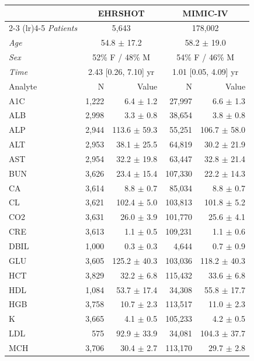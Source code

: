 \begin{table}[ht]
\centering
\scriptsize
\begin{tabular}{lrrrr}
\toprule
  & \multicolumn{2}{c}{EHRSHOT} & \multicolumn{2}{c}{MIMIC-IV} \\
\cmidrule(lr){2-3} \cmidrule(lr){4-5}
\textit{Patients} & \multicolumn{2}{c}{5,643} & \multicolumn{2}{c}{178,002} \\
\textit{Age} & \multicolumn{2}{c}{54.8 $\pm$ 17.2} & \multicolumn{2}{c}{58.2 $\pm$ 19.0} \\
\textit{Sex} & \multicolumn{2}{c}{52\% F / 48\% M} & \multicolumn{2}{c}{54\% F / 46\% M} \\
\textit{Time} & \multicolumn{2}{c}{2.43 [0.26, 7.10] yr} & \multicolumn{2}{c}{1.01 [0.05, 4.09] yr} \\
\midrule
Analyte & N & Value & N & Value \\
\midrule
A1C & 1,222 & 6.4 $\pm$ 1.2 & 27,997 & 6.6 $\pm$ 1.3 \\
ALB & 2,998 & 3.3 $\pm$ 0.8 & 38,654 & 3.8 $\pm$ 0.8 \\
ALP & 2,944 & 113.6 $\pm$ 59.3 & 55,251 & 106.7 $\pm$ 58.0 \\
ALT & 2,953 & 38.1 $\pm$ 25.5 & 64,819 & 30.2 $\pm$ 21.9 \\
AST & 2,954 & 32.2 $\pm$ 19.8 & 63,447 & 32.8 $\pm$ 21.4 \\
BUN & 3,626 & 23.4 $\pm$ 15.4 & 107,330 & 22.2 $\pm$ 14.3 \\
CA & 3,614 & 8.8 $\pm$ 0.7 & 85,034 & 8.8 $\pm$ 0.7 \\
CL & 3,621 & 102.4 $\pm$ 5.0 & 103,813 & 101.8 $\pm$ 5.2 \\
CO2 & 3,631 & 26.0 $\pm$ 3.9 & 101,770 & 25.6 $\pm$ 4.1 \\
CRE & 3,613 & 1.1 $\pm$ 0.5 & 109,231 & 1.1 $\pm$ 0.6 \\
DBIL & 1,000 & 0.3 $\pm$ 0.3 & 4,644 & 0.7 $\pm$ 0.9 \\
GLU & 3,605 & 125.2 $\pm$ 40.3 & 103,036 & 118.2 $\pm$ 40.3 \\
HCT & 3,829 & 32.2 $\pm$ 6.8 & 115,432 & 33.6 $\pm$ 6.8 \\
HDL & 1,084 & 53.7 $\pm$ 17.4 & 34,308 & 55.8 $\pm$ 17.7 \\
HGB & 3,758 & 10.7 $\pm$ 2.3 & 113,517 & 11.0 $\pm$ 2.3 \\
K & 3,665 & 4.1 $\pm$ 0.5 & 105,233 & 4.2 $\pm$ 0.5 \\
LDL & 575 & 92.9 $\pm$ 33.9 & 34,081 & 104.3 $\pm$ 37.7 \\
MCH & 3,706 & 30.4 $\pm$ 2.7 & 113,170 & 29.7 $\pm$ 2.8 \\

\end{tabular}
\end{table}
